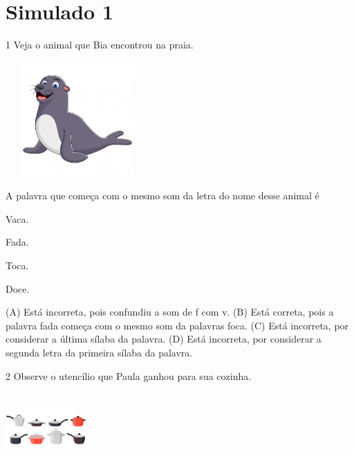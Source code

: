 \chapter{Simulado 1}

\num{1} Veja o animal que Bia encontrou na praia.

\includegraphics[width=2.16528in,height=1.72778in]{media/image139.jpeg}


A palavra que começa com o mesmo som da letra do nome desse animal é

\begin{minipage}{.5\textwidth}
\begin{escolha}
\item Vaca.

\item Fada.

\item Toca.

\item Doce.
\end{escolha}
\end{minipage}

(A) Está incorreta, pois confundiu a som de f com v.
(B) Está correta, pois a palavra fada começa com o mesmo som da palavras
foca.
(C) Está incorreta, por considerar a última sílaba da palavra.
(D) Está incorreta, por considerar a segunda letra da primeira sílaba da
palavra.

\num{2} Observe o utencílio que Paula ganhou para sua cozinha.

\includegraphics[width=1.22222in,height=1.11389in]{media/image19.jpeg}

